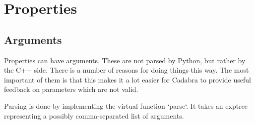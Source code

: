
\section{Properties}

\subsection{Arguments}

Properties can have arguments. These are not parsed by Python, but
rather by the C++ side. There is a number of reasons for doing things
this way. The most important of them is that this makes it a lot
easier for Cadabra to provide useful feedback on parameters which are
not valid.

Parsing is done by implementing the virtual function `parse`. It takes
an exptree representing a possibly comma-separated list of arguments.

